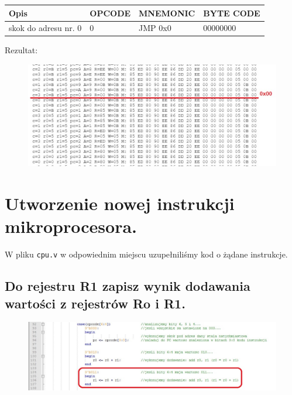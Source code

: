 \documentclass[12pt,a4paper]{article}
\begin{document}
	\begin{table}[!ht]
		\centering
		\begin{tabular}{l|l|l|l}
		Opis                 & OPCODE & MNEMONIC & BYTE CODE \\ \hline
		skok do adresu nr. 0 & 0      & JMP 0x0  & 00000000 
		\end{tabular}
		\end{table}
	Rezultat:
	
	\begin{figure}[!ht]
		\centering
		\includegraphics[width=1\linewidth]{graphics/log7}
	\end{figure}
	
	
		\newpage
	
	\section{Utworzenie nowej instrukcji mikroprocesora.}
	W pliku \texttt{cpu.v} w odpowiednim miejscu uzupełniliśmy kod o żądane instrukcje.
	\subsection{Do rejestru R1 zapisz wynik dodawania wartości z rejestrów Ro i R1.}
	\begin{figure}[!ht]
		\centering
		\includegraphics[width=1\linewidth]{graphics/code1}
	\end{figure}
\end{document}
